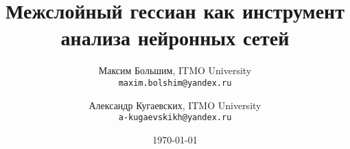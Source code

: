 \documentclass[a4paper,12pt]{article}
\title{Межслойный гессиан как инструмент анализа нейронных сетей}
\author{Максим Большим, ITMO University \\ \texttt{maxim.bolshim@yandex.ru}
        \and
        Александр Кугаевских, ITMO University \\ \texttt{a-kugaevskikh@yandex.ru}
}
\date{\today}
\begin{document}
\sloppy
\maketitle
\end{document}

